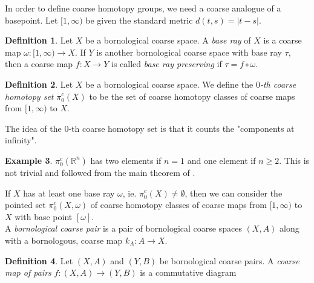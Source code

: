 \documentclass[a4paper,11pt]{article}
\theoremstyle{definition}
\newtheorem{definition}{Definition}[section]
\newtheorem{example}[definition]{Example}
\theoremstyle{plain}
\theoremstyle{remark}
\begin{document}
In order to define coarse homotopy groups, we need a coarse analogue of a basepoint. Let $[1,\infty)$ be given the standard metric $d(t,s) = |t-s|$. 

\begin{definition} Let $X$ be a bornological coarse space. A \textit{base ray} of $X$ is a coarse map $\omega: [1,\infty)\rightarrow X$. If $Y$ is another bornological coarse space with base ray $\tau$, then a coarse map $f: X\rightarrow Y$ is called \textit{base ray preserving} if $\tau=f\circ \omega$. 
\end{definition}

\begin{definition} Let $X$ be a bornological coarse space. We define the \textit{$0$-th coarse homotopy set} $\pi_0^c(X)$ to be the set of coarse homotopy classes of coarse maps from $[1,\infty)$ to $X$.
\end{definition}

The idea of the $0$-th coarse homotopy set is that it counts the "components at infinity". 

\begin{example} $\pi_0^c(\mathbb{R}^n)$ has two elements if $n=1$ and one element if $n\geq 2$. This is not trivial and followed from the main theorem of \cite{mitchener2020coarse}.
\end{example}

If $X$ has at least one base ray $\omega$, ie. $\pi_0^c(X) \neq \emptyset$, then we can consider the pointed set $\pi^c_{0}(X,\omega)$ of coarse homotopy classes of coarse maps from $[1,\infty)$ to $X$ with base point $[\omega]$. \\

A \textit{bornological coarse pair} is a pair of bornological coarse spaces $(X,A)$ along with a bornologous, coarse map $k_A: A\rightarrow X$. 
\begin{definition} Let $(X,A)$ and $(Y,B)$ be bornological coarse pairs. A \textit{coarse map of pairs} $f:(X,A)\rightarrow (Y,B)$ is a commutative diagram 

\begin{figure}[H]
\center
{}
\end{figure}

\end{definition}
\end{document}
